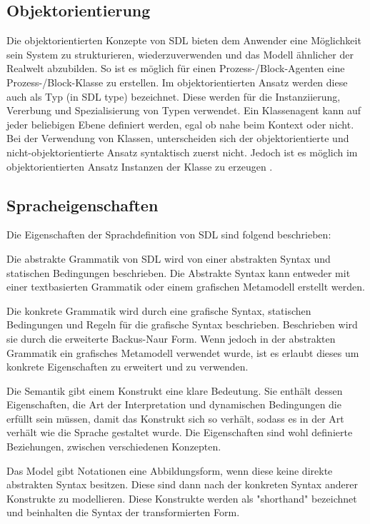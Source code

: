 \pagebreak
\subsection{Objektorientierung} 
\label{ssc:Vererbung}
Die objektorientierten Konzepte von \ac{SDL} bieten dem Anwender eine Möglichkeit sein System zu strukturieren, wiederzuverwenden und das Modell ähnlicher der Realwelt abzubilden. So ist es möglich für einen Prozess-/Block-Agenten eine Prozess-/Block-Klasse zu erstellen. Im objektorientierten Ansatz werden diese auch als Typ (in \ac{SDL} type) bezeichnet. Diese werden für die Instanziierung, Vererbung und Spezialisierung von Typen verwendet. Ein Klassenagent kann auf jeder beliebigen Ebene definiert werden, egal ob nahe beim Kontext oder nicht.
Bei der Verwendung von Klassen, unterscheiden sich der objektorientierte und nicht-objektorientierte Ansatz syntaktisch zuerst nicht. Jedoch ist es möglich im objektorientierten Ansatz Instanzen der Klasse zu erzeugen \cite[4\psqq]{ITUT100_2016}.

\subsection{Spracheigenschaften}
\label{ssc:Spracheigenschaften}
Die Eigenschaften der Sprachdefinition von \ac{SDL} sind folgend beschrieben\cite[2\psq]{ITUT111_2016}:
\begin{itemize}{
		\item[Abstrakte Grammatik] Die abstrakte Grammatik von \ac{SDL} wird von einer abstrakten Syntax und statischen Bedingungen 
		beschrieben. Die Abstrakte Syntax kann entweder mit einer textbasierten Grammatik oder einem grafischen Metamodell erstellt werden.
		
		\item[Konkrete Grammatik] Die konkrete Grammatik wird durch eine grafische Syntax, statischen Bedingungen und Regeln für die grafische Syntax beschrieben.
		Beschrieben wird sie durch die erweiterte Backus-Naur Form. Wenn jedoch in der abstrakten Grammatik ein 
		grafisches Metamodell verwendet wurde, ist es erlaubt dieses um konkrete Eigenschaften zu erweitert und zu verwenden.
		
		\item[Semantik] Die Semantik gibt einem Konstrukt eine klare Bedeutung. Sie enthält dessen Eigenschaften, die Art der Interpretation und dynamischen Bedingungen die erfüllt sein müssen, damit das Konstrukt sich so verhält, sodass es in der Art verhält wie die Sprache gestaltet wurde. Die Eigenschaften sind wohl definierte Beziehungen, zwischen verschiedenen Konzepten.
		
		\item[Model] Das Model gibt Notationen eine Abbildungsform, wenn diese keine direkte abstrakten Syntax besitzen. Diese sind dann nach der konkreten Syntax anderer Konstrukte zu modellieren. Diese Konstrukte werden als "shorthand" bezeichnet und  beinhalten die Syntax der transformierten Form.
}\end{itemize}


